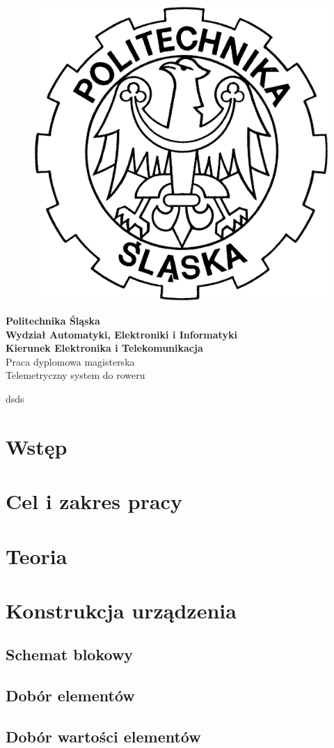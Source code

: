 \documentclass[12pt]{report}
\begin{document}
\hspace{2cm}%
\begin{figure}[!t]
\centering
\includegraphics[width=2.5 cm, height=2.5 cm]{Obrazy/godlo_polibudy} 
\end{figure}
\begin{center}
{\Large\textbf{Politechnika Śląska\\
Wydział Automatyki, Elektroniki i Informatyki
\\[0.3cm]Kierunek Elektronika i Telekomunikacja}}
\\[4cm]
{\Large Praca dyplomowa magisterska}
\\[3cm] 
{\large Telemetryczny system do roweru }
\end{center}
{\fontsize{0.491904cm}{0cm}\selectfont dsds}


\tableofcontents	%

\chapter{Wstęp} \label{rozdz.wstep} 


\chapter{Cel i zakres pracy} \label{etykietarozdzialu2}


\chapter{Teoria}


\chapter{Konstrukcja urządzenia}
\section{Schemat blokowy}
\section{Dobór elementów}
\section{Dobór wartości elementów}
\end{document}
